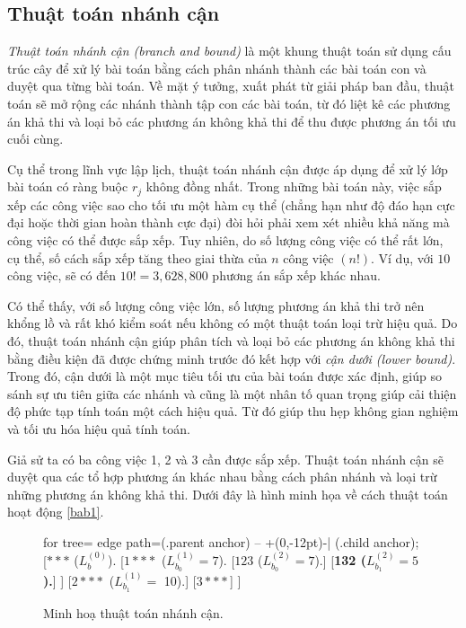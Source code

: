 \documentclass[12pt,a4paper]{report}
\begin{document}
\subsection*{Thuật toán nhánh cận}
\textit{Thuật toán nhánh cận (branch and bound)} là một khung thuật toán sử dụng cấu trúc cây để xử lý bài toán bằng cách phân nhánh thành các bài toán con và duyệt qua từng bài toán. Về mặt ý tưởng, xuất phát từ giải pháp ban đầu, thuật toán sẽ mở rộng các nhánh thành tập con các bài toán, từ đó liệt kê các phương án khả thi và loại bỏ các phương án không khả thi để thu được phương án tối ưu cuối cùng.

Cụ thể trong lĩnh vực lập lịch, thuật toán nhánh cận được áp dụng để xử lý lớp bài toán có ràng buộc $r_j$ không đồng nhất. Trong những bài toán này, việc sắp xếp các công việc sao cho tối ưu một hàm cụ thể (chẳng hạn như độ đáo hạn cực đại hoặc thời gian hoàn thành cực đại) đòi hỏi phải xem xét nhiều khả năng mà công việc có thể được sắp xếp. Tuy nhiên, do số lượng công việc có thể rất lớn, cụ thể, số cách sắp xếp tăng theo giai thừa của $n$ công việc $(n!)$. Ví dụ, với $10$ công việc, sẽ có đến $10! = 3,628,800$ phương án sắp xếp khác nhau.

Có thể thấy, với số lượng công việc lớn, số lượng phương án khả thi trở nên khổng lồ và rất khó kiểm soát nếu không có một thuật toán loại trừ hiệu quả. Do đó, thuật toán nhánh cận giúp phân tích và loại bỏ các phương án không khả thi bằng điều kiện đã được chứng minh trước đó kết hợp với \textit{cận dưới (lower bound)}. Trong đó, cận dưới là một mục tiêu tối ưu của bài toán được xác định, giúp so sánh sự ưu tiên giữa các nhánh và cũng là một nhân tố quan trọng giúp cải thiện độ phức tạp tính toán một cách hiệu quả. Từ đó giúp thu hẹp không gian nghiệm và tối ưu hóa hiệu quả tính toán.


Giả sử ta có ba công việc 1, 2 và 3 cần được sắp xếp. Thuật toán nhánh cận sẽ duyệt qua các tổ hợp phương án khác nhau bằng cách phân nhánh và loại trừ những phương án không khả thi. Dưới đây là hình minh họa về cách thuật toán hoạt động \eqref{bab1}.

\begin{figure}[h!]
	\centering
	\begin{forest} for tree={
		edge path={\noexpand{} (.parent anchor) -- +(0,-12pt)-| (.child anchor);}
	}
	[{$***$ ($L_b^{(0)}$).}
		[{$1***$ ($L_{b_0}^{(1)}=7$).}
			[{$123$ ($L_{b_0}^{(2)} =7$).}]
			[{\textbf{132 ($L_{b_1}^{(2)} =5$).}}]
		]
		[{$2***$ ($L_{b_1}^{(1)} =$ 10).}]
		[$3***$]
	]
	\end{forest}
\caption{\label{bab1}Minh hoạ thuật toán nhánh cận.}
\end{figure}
\end{document}
